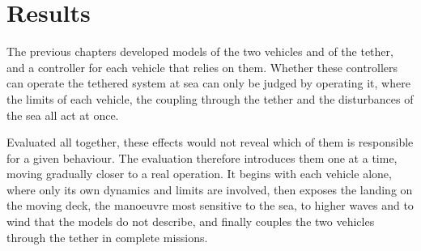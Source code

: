 
\chapter{Results}
\label{chapter:results}

The previous chapters developed models of the two vehicles and of the tether, and a controller for each vehicle that relies on them. Whether these controllers can operate the tethered system at sea can only be judged by operating it, where the limits of each vehicle, the coupling through the tether and the disturbances of the sea all act at once.

Evaluated all together, these effects would not reveal which of them is responsible for a given behaviour. The evaluation therefore introduces them one at a time, moving gradually closer to a real operation. It begins with each vehicle alone, where only its own dynamics and limits are involved, then exposes the landing on the moving deck, the manoeuvre most sensitive to the sea, to higher waves and to wind that the models do not describe, and finally couples the two vehicles through the tether in complete missions.




    

